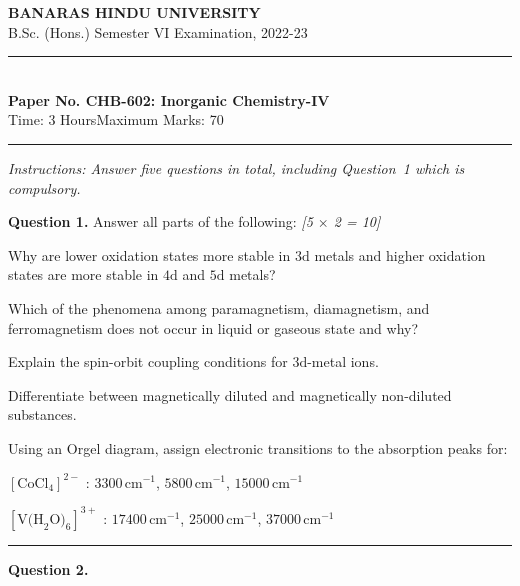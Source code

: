 \documentclass[11pt,a4paper]{article}
\newcommand{\pts}[1]{\hfill   \textit{[#1]}}
\begin{document}
\begin{center}
  {\large\bfseries BANARAS HINDU UNIVERSITY}\\[2pt]
  {\normalsize B.Sc. (Hons.) Semester VI Examination, 2022-23}\\[6pt]
  \rule{0.8\linewidth}{0.5pt}\\[6pt]
  {\large\bfseries Paper No. CHB-602: Inorganic Chemistry-IV}\\[4pt]
  {\normalsize Time: 3 Hours\hfill Maximum Marks: 70}
\end{center}
\rule{\linewidth}{0.4pt}
\small



\noindent   \textit{Instructions: Answer five questions in total, including Question~1 which is compulsory.}

\normalsize
\bigskip




\noindent   \textbf{Question 1.} Answer all parts of the following: \pts{5 $ \times$ 2 = 10}

\begin{parts}
  \item Why are lower oxidation states more stable in $3 \text{d}$ metals and higher oxidation states are more stable in $4 \text{d}$ and $5 \text{d}$ metals?
  \item Which of the phenomena among paramagnetism, diamagnetism, and ferromagnetism does not occur in liquid or gaseous state and why?
  \item Explain the spin-orbit coupling conditions for $3 \text{d}$-metal ions.
  \item Differentiate between magnetically diluted and magnetically non-diluted substances.
  \item Using an Orgel diagram, assign electronic transitions to the absorption peaks for:
  
\begin{parts}
    \item $[ \text{CoCl}_4]^{2-}$ : $3300\, \text{cm}^{-1}$, $5800\, \text{cm}^{-1}$, $15000\, \text{cm}^{-1}$
    \item $[ \text{V(H}_2 \text{O)}_6]^{3+}$ : $17400\, \text{cm}^{-1}$, $25000\, \text{cm}^{-1}$, $37000\, \text{cm}^{-1}$
  \end{parts}
\end{parts}

\medskip\rule{\linewidth}{0.2pt}




\noindent   \textbf{Question 2.}
\end{document}
